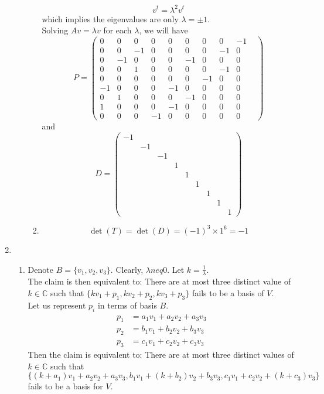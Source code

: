 \documentclass[12pt]{article}
\theoremstyle{definition}
\begin{document}
\begin{enumerate}
\begin{enumerate}
\begin{enumerate}
  \[
v^t = \lambda^2 v^t
  \]
  which implies the eigenvalues are only $\lambda = \pm 1$.\\Solving $Av=\lambda v$ for each $\lambda$, we will have
\[
P = \begin{pmatrix}
0&0&0&0&0&0&0&0&-1\\
0&0&-1&0&0&0&0&-1&0\\
0&-1&0&0&0&-1&0&0&0&\\
0&0&1&0&0&0&0&-1&0\\
0&0&0&0&0&0&-1&0&0&\\
-1&0&0&0&-1&0&0&0&0\\
0&1&0&0&0&-1&0&0&0\\
1&0&0&0&-1&0&0&0&0\\
0&0&0&-1&0&0&0&0&0
\end{pmatrix}
\]
and
\[
D=\begin{pmatrix}
-1&&&&&&&&\\
&-1&&&&&&&\\
&&-1&&&&&&\\
&&&1&&&&&\\
&&&&1&&&&\\
&&&&&1&&&\\
&&&&&&1&&\\
&&&&&&&1&\\
&&&&&&&&1
\end{pmatrix}
\]
\item 
\[
\det(T)=\det(D) = (-1)^3\times 1^6 = -1
\]
\end{enumerate}
  \end{enumerate}
\item
\begin{enumerate}
  \item Denote $B = \{v_1,v_2,v_3\}$. Clearly, $\lambda neq 0$. Let $k = \frac{1}{\lambda}$.\\The claim is then equivalent to: There are at most three distinct value of $k\in\mathbb{C}$ such that $\{kv_1 + p_1, kv_2 + p_2, kv_3 + p_3\}$ fails to be a basis of $V$.\\
  Let us represent $p_i$ in terms of basis $B$.
  \begin{align*}
  p_1 &= a_1v_1 + a_2v_2 + a_3v_3\\
  p_2 &= b_1v_1 + b_2v_2 + b_3v_3\\
  p_3 &= c_1v_1 + c_2v_2 + c_3v_3
  \end{align*}
  Then the claim is equivalent to: There are at most three distinct values of $k\in\mathbb{C}$ such that $\{(k+a_1)v_1+a_2v_2+a_3v_3,b_1v_1+(k+b_2)v_2+b_3v_3,c_1v_1+c_2v_2+(k+c_3)v_3\}$ fails to be a basis for $V$.\\

\end{enumerate}
\end{enumerate}
\end{document}
